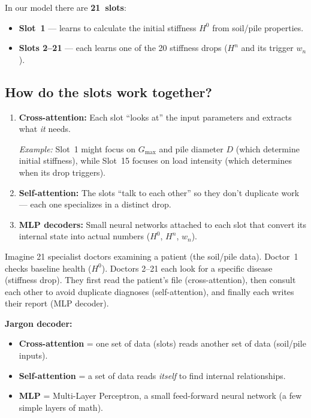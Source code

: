 \documentclass[11pt,a4paper]{article}
\begin{document}
In our model there are \textbf{21~slots}:
\begin{itemize}[noitemsep]
  \item \textbf{Slot~1} --- learns to calculate the initial stiffness $H^0$
        from soil/pile properties.
  \item \textbf{Slots 2--21} --- each learns one of the 20 stiffness drops
        ($H^n$ and its trigger $w_n$).
\end{itemize}

\subsection{How do the slots work together?}

\begin{enumerate}
  \item \textbf{Cross-attention:} Each slot ``looks at'' the input parameters
        and extracts what \textit{it} needs.

        \textit{Example:} Slot~1 might focus on $G_{\max}$ and pile diameter
        $D$ (which determine initial stiffness), while Slot~15 focuses on
        load intensity (which determines when its drop triggers).

  \item \textbf{Self-attention:} The slots ``talk to each other'' so they
        don't duplicate work --- each one specializes in a distinct drop.

  \item \textbf{MLP decoders:} Small neural networks attached to each slot
        that convert its internal state into actual numbers ($H^0$, $H^n$,
        $w_n$).
\end{enumerate}

\begin{tcolorbox}[colback=yellow!5, colframe=yellow!50!black, title=Analogy]
Imagine 21 specialist doctors examining a patient (the soil/pile data).
Doctor~1 checks baseline health ($H^0$).  Doctors 2--21 each look for a
specific disease (stiffness drop).  They first read the patient's file
(cross-attention), then consult each other to avoid duplicate diagnoses
(self-attention), and finally each writes their report (MLP decoder).
\end{tcolorbox}

\textbf{Jargon decoder:}
\begin{itemize}[noitemsep]
  \item \textbf{Cross-attention} = one set of data (slots) reads another set
        of data (soil/pile inputs).
  \item \textbf{Self-attention} = a set of data reads \textit{itself} to find
        internal relationships.
  \item \textbf{MLP} = Multi-Layer Perceptron, a small feed-forward neural
        network (a few simple layers of math).
\end{itemize}
\end{document}
